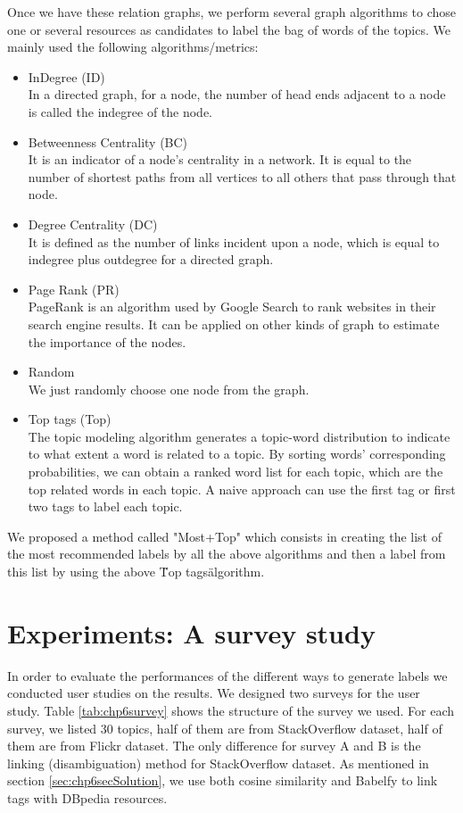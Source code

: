 Once we have these relation graphs, we perform several graph algorithms to chose one or several resources as candidates to label the bag of words of the topics. We mainly used the following algorithms/metrics:
\begin{itemize}
    \item {InDegree (ID)} \\
    In a directed graph, for a node, the number of head ends adjacent to a node is called the indegree of the node. 
    \item {Betweenness Centrality (BC)} \\
    It is an indicator of a node's centrality in a network. It is equal to the number of shortest paths from all vertices to all others that pass through that node.
    \item {Degree Centrality (DC)} \\
    It is defined as the number of links incident upon a node, which is equal to indegree plus outdegree for a directed graph.
    \item {Page Rank \cite{chp6page1999pagerank} (PR)}\\
    PageRank is an algorithm used by Google Search to rank websites in their search engine results. It can be applied on other kinds of graph to estimate the importance of the nodes.
    \item {Random} \\
    We just randomly choose one node from the graph.
    \item {Top tags (Top)} \\
    The topic modeling algorithm generates a topic-word distribution to indicate to what extent a word is related to a topic. By sorting words' corresponding probabilities, we can obtain a ranked word list for each topic, which are the top related words in each topic. A naive approach can use the first tag or first two tags to label each topic. 
\end{itemize}

We proposed a method called "Most+Top" which consists in creating the list of the most recommended labels by all the above algorithms and then a label from this list by using the above \"Top tags\" algorithm. 


\section{Experiments: A survey study}
In order to evaluate the performances of the different ways to generate labels we conducted user studies on the results. We designed two surveys for the user study. Table \ref{tab:chp6survey} shows the structure of the survey we used. For each survey, we listed 30 topics, half of them are from StackOverflow dataset, half of them are from Flickr dataset. 
The only difference for survey A and B is the linking (disambiguation) method for StackOverflow dataset. As mentioned in section \ref{sec:chp6secSolution}, we use both cosine similarity and Babelfy to link tags with DBpedia resources. 


